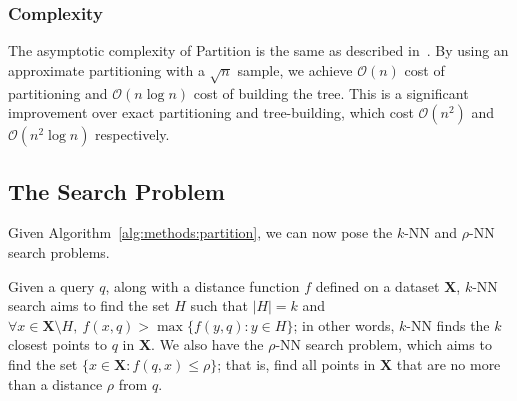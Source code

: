 

\subsubsection{Complexity}
\label{sec:methods:clustering:complexity}

The asymptotic complexity of Partition is the same as described in~\cite{ishaq2019clustered}.
By using an approximate partitioning with a $\sqrt{n}$ sample, we achieve $\mathcal{O}(n)$ cost of partitioning and $\mathcal{O}(n \log n)$ cost of building the tree.
This is a significant improvement over exact partitioning and tree-building, which cost $\mathcal{O}(n^2)$ and $\mathcal{O}(n^2 \log n)$ respectively.


\subsection{The Search Problem}
\label{sec:methods:the-search-problem}

Given Algorithm~\ref{alg:methods:partition}, we can now pose the $k$-NN and $\rho$-NN search problems.

Given a query $q$, along with a distance function $f$ defined on a dataset $\textbf{X}$, $k$-NN search aims to find the set $H$ such that $|H| = k$ and $\forall x \in \textbf{X} \setminus H, \ f(x, q) > \max \{ f(y, q): y \in H \}$;
in other words, $k$-NN finds the $k$ closest points to $q$ in $\textbf{X}$.
We also have the $\rho$-NN search problem, which aims to find the set $\{x \in \textbf{X}: f(q, x) \leq \rho \}$;
that is, find all points in $\textbf{X}$ that are no more than a distance $\rho$ from $q$.

